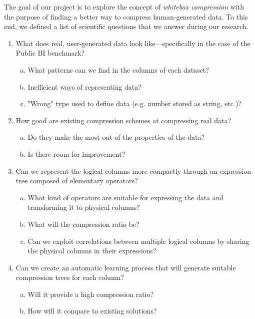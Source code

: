 The goal of our project is to explore the concept of \emph{whitebox compression} with the purpose of finding a better way to compress human-generated data. To this end, we defined a list of scientific questions that we answer during our research.
\begin{enumerate}[1)]
    \item What does real, user-generated data look like---specifically in the case of the Public BI benchmark?
    \begin{enumerate}[a)]
        \item What patterns can we find in the columns of each dataset?
        \item Inefficient ways of representing data?
        \item "Wrong" type used to define data (e.g. number stored as string, etc.)?
    \end{enumerate}
    \item How good are existing compression schemes at compressing real data?
    \begin{enumerate}[a)]
        \item Do they make the most out of the properties of the data?
        \item Is there room for improvement?
    \end{enumerate}
    \item Can we represent the logical columns more compactly through an expression tree composed of elementary operators?
    \begin{enumerate}[a)]
        \item What kind of operators are suitable for expressing the data and transforming it to physical columns?
        \item What will the compression ratio be?
        \item Can we exploit correlations between multiple logical columns by sharing the physical columns in their expressions?
    \end{enumerate}
    \item Can we create an automatic learning process that will generate suitable compression trees for each column?
    \begin{enumerate}[a)]
        \item Will it provide a high compression ratio?
        \item How will it compare to existing solutions?
    \end{enumerate}
\end{enumerate}

